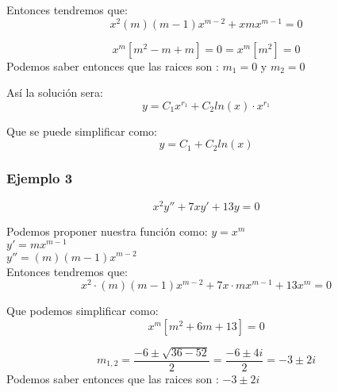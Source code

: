 \documentclass[12pt]{report}                                %
\begin{document}
        Entonces tendremos que:
        \begin{equation*}
            x^2 (m)(m-1)x^{m-2} + x mx^{m-1} = 0
        \end{equation*}

        \begin{equation*}
            x^m [m^2 - m + m] = 0 = x^m [m^2] = 0
        \end{equation*}
        Podemos saber entonces que las raices son : $ m_1 = 0$ y $m_2 = 0$

        Así la solución sera:
        \begin{equation*}
            y = C_1 x ^{r_1} + C_2 ln(x) \cdot x^{r_1}
        \end{equation*}

        Que se puede simplificar como:
        \begin{equation*}
            y = C_1 + C_2 ln(x)
        \end{equation*}

        \clearpage
        \subsubsection{Ejemplo 3}
        \begin{equation*}
            x^2 y'' + 7 x y' + 13y = 0
        \end{equation*}

        Podemos proponer nuestra función como:
        $y = x^m$\\
        $y' = mx^{m-1}$\\
        $y'' = (m)(m-1)x^{m-2}$\\

        Entonces tendremos que:
        \begin{equation*}
            x^2 \cdot (m)(m-1)x^{m-2} + 7x \cdot mx^{m-1} + 13 x^m= 0
        \end{equation*}

        Que podemos simplificar como:
        \begin{equation*}
            x^m [m^2 + 6m + 13] = 0
        \end{equation*}

        \begin{equation*}
            m_{1,2} = \frac{-6 \pm \sqrt{36-52}}{2} = \frac{-6 \pm 4i}{2} = -3 \pm 2i
        \end{equation*}
        Podemos saber entonces que las raices son : $ -3 \pm 2i$
\end{document}
